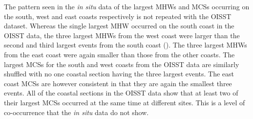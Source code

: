 \documentclass[a4paper,10pt,review]{elsarticle}
\begin{document}
The pattern seen in the \emph{in situ} data of the largest MHWs and MCSs occurring on the south, west and east coasts respectively is not repeated with the OISST dataset. Whereas the single largest MHW occurred on the south coast in the OISST data, the three largest MHWs from the west coast were larger than the second and third largest events from the south coast (). The three largest MHWs from the east coast were again smaller than those from the other coasts. The largest MCSs for the south and west coasts from the OISST data are similarly shuffled with no one coastal section having the three largest events. The east coast MCSs are however consistent in that they are again the smallest three events. All of the coastal sections in the OISST data show that at least two of their largest MCSs occurred at the same time at different sites. This is a level of co-occurrence that the \emph{in situ} data do not show.
\end{document}
